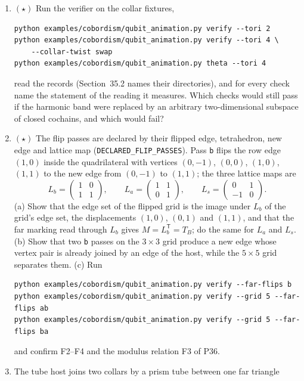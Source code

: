 \documentclass[11pt]{article}
\begin{document}
\begin{enumerate}[label=\textbf{P\arabic*.},leftmargin=*,start=79]
\item $(\star)$ Run the verifier on the collar fixtures,
\begin{verbatim}
python examples/cobordism/qubit_animation.py verify --tori 2
python examples/cobordism/qubit_animation.py verify --tori 4 \
    --collar-twist swap
python examples/cobordism/qubit_animation.py theta --tori 4
\end{verbatim}
  read the records (Section~35.2 names their directories), and for every check name
  the statement of the reading it measures. Which checks would still pass if
  the harmonic band were replaced by an arbitrary two-dimensional subspace
  of closed cochains, and which would fail?
\item $(\star)$ The flip passes are declared by their flipped edge, tetrahedron, new edge
  and lattice map (\texttt{DECLARED\_FLIP\_PASSES}). Pass \texttt{b} flips the
  row edge $(1,0)$ inside the quadrilateral with vertices $(0,-1)$, $(0,0)$,
  $(1,0)$, $(1,1)$ to the new edge from $(0,-1)$ to $(1,1)$; the three lattice
  maps are
  \[
   L_b = \begin{pmatrix}1&0\\1&1\end{pmatrix},\qquad
   L_a = \begin{pmatrix}1&1\\0&1\end{pmatrix},\qquad
   L_s = \begin{pmatrix}0&1\\-1&0\end{pmatrix}.
  \]
  (a) Show that the edge set of the flipped grid is the image under $L_b$ of
  the grid's edge set, the displacements $(1,0)$, $(0,1)$ and $(1,1)$, and that
  the far marking read through $L_b$ gives $M = L_b^{\mathsf T} = T_B$; do the
  same for $L_a$ and $L_s$.
  (b) Show that two \texttt{b} passes on the $3\times3$ grid produce a new edge
  whose vertex pair is already joined by an edge of the host, while the
  $5\times5$ grid separates them. (c) Run
\begin{verbatim}
python examples/cobordism/qubit_animation.py verify --far-flips b
python examples/cobordism/qubit_animation.py verify --grid 5 --far-flips ab
python examples/cobordism/qubit_animation.py verify --grid 5 --far-flips ba
\end{verbatim}
  and confirm F2--F4 and the modulus relation F3 of P36.
\item The tube host joins two collars by a prism tube between one far triangle

\end{enumerate}
\end{document}

